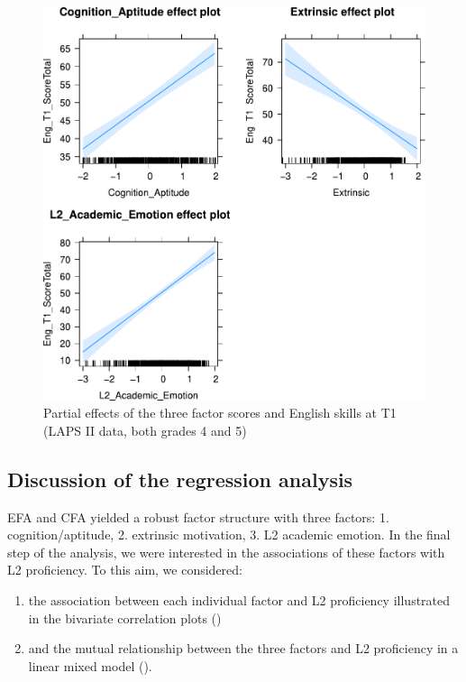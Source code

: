 \documentclass[output=paper]{langsci/langscibook}
\begin{document}
\begin{figure}
\includegraphics[width=.75\textwidth]{figures/Figure3.3.pdf}
\caption{\label{fig:03:3}Partial effects of the three factor scores and English skills at T1 (LAPS II data, both grades 4 and 5)}
\end{figure}

\subsection{Discussion of the regression analysis}

EFA and CFA yielded a robust factor structure with three factors: 1. cognition/aptitude, 2. extrinsic motivation, 3. L2 academic emotion. In the final step of the analysis, we were interested in the associations of these factors with L2 proficiency. To this aim, we considered:

\begin{enumerate}
\item the association between each individual factor and L2 proficiency illustrated in the bivariate correlation plots ()
\item and the mutual relationship between the three factors and L2 proficiency in a linear mixed model ().
\end{enumerate}
\end{document}
